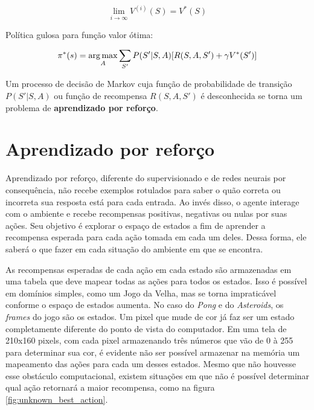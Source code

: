 \begin{equation} \label{eq:qvalue}
\lim_{i\to\infty} V^{(i)}(S) = V^{*}(S)
\end{equation}

Política gulosa para função valor ótima:

\begin{equation} \label{eq:opt_pol}
\pi^{*}(s) = \operatorname*{arg\,max}_{A}\sum_{S'}P(S'|S,A)[R(S,A,S') + \gamma V^{*}(S')]
\end{equation}

Um processo de decisão de Markov cuja função de probabilidade de transição $P(S'|S,A)$ ou função de recompensa $R(S,A,S')$ é desconhecida se torna um problema de \textbf{aprendizado por reforço}.


\section{Aprendizado por reforço}
\label{sec:rl}

Aprendizado por reforço, diferente do supervisionado e de redes neurais por consequência, não recebe exemplos rotulados para saber o quão correta ou incorreta sua resposta está para cada entrada.
Ao invés disso, o agente interage com o ambiente e recebe recompensas positivas, negativas ou nulas por suas ações.
Seu objetivo é explorar o espaço de estados a fim de aprender a recompensa esperada para cada ação tomada em cada um deles.
Dessa forma, ele saberá o que fazer em cada situação do ambiente em que se encontra.

As recompensas esperadas de cada ação em cada estado são armazenadas em uma tabela que deve mapear todas as ações para todos os estados.
Isso é possível em domínios simples, como um Jogo da Velha, mas se torna impraticável conforme o espaço de estados aumenta.
No caso do \textit{Pong} e do \textit{Asteroids}, os \textit{frames} do jogo são os estados.
Um pixel que mude de cor já faz ser um estado completamente diferente do ponto de vista do computador.
Em uma tela de 210x160 pixels, com cada pixel armazenando três números que vão de 0 à 255 para determinar sua cor, é evidente não ser possível armazenar na memória um mapeamento das ações para cada um desses estados.
Mesmo que não houvesse esse obstáculo computacional, existem situações em que não é possível determinar qual ação retornará a maior recompensa, como na figura \ref{fig:unknown_best_action}.


